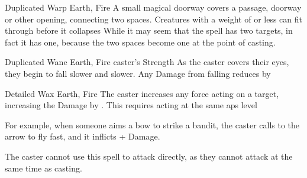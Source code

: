 \ifodd\value{diceNo}

  {Duplicated}%
  {Warp}%
  {Earth, Fire}%
  {}%
  {A small magical doorway covers a passage, doorway or other opening, connecting two spaces.
  Creatures with a \gls{weight} of  or less can fit through before it collapses}%
  {While it may seem that the spell has two targets, in fact it has one, because the two spaces become one at the point of casting.}

  {Duplicated}%
  {Wane}%
  {Earth, Fire}%
  {caster's Strength}%
  {As the caster covers their eyes, they begin to fall slower and slower.
  Any Damage from falling reduces by }%
  {}

\else

  {Detailed}%
  {Wax}%
  {Earth, Fire}%
  {}%
  {The caster increases any force acting on a target, increasing the Damage by .
  This requires acting at the same \glspl{ap} level}%
  {For example, when someone aims a bow to strike a bandit, the caster calls to the arrow to fly fast, and it inflicts + Damage.

    The caster cannot use this spell to attack directly, as they cannot attack at the same time as casting.}

\fi
